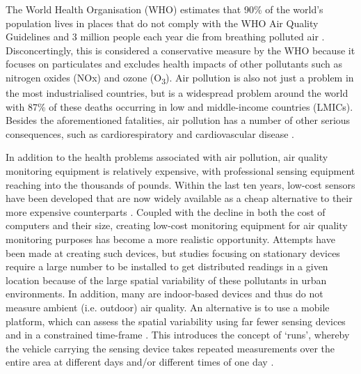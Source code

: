 \documentclass[11pt]{report}
\begin{document}
The World Health Organisation (WHO) estimates that 90\% of the world's population lives in places that do not comply with the WHO Air Quality Guidelines and 3 million people each year die from breathing polluted air \citep{WHO2016ambient}. Disconcertingly, this is considered a conservative measure by the WHO because it focuses on particulates and excludes health impacts of other pollutants such as nitrogen oxides (NOx) and ozone (O\textsubscript{3}). Air pollution is also not just a problem in the most industrialised countries, but is a widespread problem around the world with 87\% of these deaths occurring in low and middle-income countries (LMICs). Besides the aforementioned fatalities, air pollution has a number of other serious consequences, such as cardiorespiratory and cardiovascular disease \citep{pope1995particulate,dockery1993_6cityairpoll,pope2002lungcancercardiomortality}.


In addition to the health problems associated with air pollution, air quality monitoring equipment is relatively expensive, with professional sensing equipment reaching into the thousands of pounds. Within the last ten years, low-cost sensors have been developed that are now widely available as a cheap alternative to their more expensive counterparts \citep{Clements2017lowcostworkshop}. Coupled with the decline in both the cost of computers and their size, creating low-cost monitoring equipment for air quality monitoring purposes has become a more realistic opportunity. Attempts have been made at creating such devices, but studies focusing on stationary devices require a large number to be installed to get distributed readings in a given location because of the large spatial variability of these pollutants in urban environments. In addition, many are indoor-based devices and thus do not measure ambient (i.e. outdoor) air quality. An alternative is to use a mobile platform, which can assess the spatial variability using far fewer sensing devices and in a constrained time-frame \citep{Hagler2010durhamallelectric,Wallace2009mobilehamilton,Westerdahl2005losangeles,Weijers2004movingmeasurementunit,Adams2012hamilton20052010,Elen2013aeroflex}. This introduces the concept of `runs', whereby the vehicle carrying the sensing device takes repeated measurements over the entire area at different days and/or different times of one day \citep{Peters2013cycleruns}.
\end{document}
